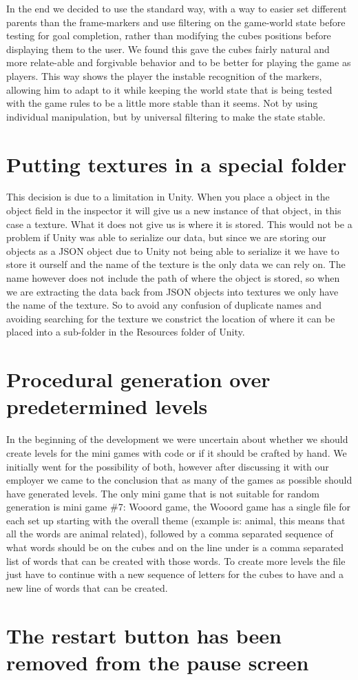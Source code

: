 In the end we decided to use the standard way, with a way to easier set different parents than the frame-markers and use filtering on the game-world state before testing for goal completion, rather than modifying the cubes positions before displaying them to the user. We found this gave the cubes fairly natural and more relate-able and forgivable behavior and to be better for playing the game as players. This way shows the player the instable recognition of the markers, allowing him to adapt to it while keeping the world state that is being tested with the game rules to be a little more stable than it seems. Not by using individual manipulation, but by universal filtering to make the state stable.


\section{Putting textures in a special folder}
This decision is due to a limitation in Unity. When you place a object in the object field in the inspector it will give us a new instance of that object, in this case a texture. What it does not give us is where it is stored. This would not be a problem if Unity was able to serialize our data, but since we are storing our objects as a JSON object due to Unity not being able to serialize it we have to store it ourself and the name of the texture is the only data we can rely on. The name however does not include the path of where the object is stored, so when we are extracting the data back from JSON objects into textures we only have the name of the texture. So to avoid any confusion of duplicate names and avoiding searching for the texture we constrict the location of where it can be placed into a sub-folder in the Resources folder of Unity.

\section{Procedural generation over predetermined levels}
In the beginning of the development we were uncertain about whether we should create levels for the mini games with code or if it should be crafted by hand. We initially went for the possibility of both, however after discussing it with our employer we came to the conclusion that as many of the games as possible should have generated levels. The only mini game that is not suitable for random generation is mini game \#7: Wooord game, the Wooord game has a single file for each set up starting with the overall theme (example is: animal, this means that all the words are animal related), followed by a comma separated sequence of what words should be on the cubes and on the line under is a comma separated list of words that can be created with those words. To create more levels the file just have to continue with a new sequence of letters for the cubes to have and a new line of words that can be created.

\section{The restart button has been removed from the pause screen}

